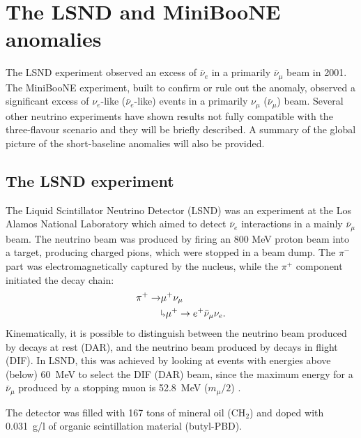 \chapter{\label{ch:3-anomalies}The LSND and MiniBooNE anomalies}

\minitoc

The LSND experiment observed an excess of $\bar{\nu}_{e}$ in a primarily $\bar{\nu}_{\mu}$ beam in 2001. The MiniBooNE experiment, built to confirm or rule out the anomaly, observed a significant excess of $\nu_{e}$-like ($\bar{\nu}_{e}$-like) events in a primarily $\nu_{\mu}$ ($\bar{\nu}_{\mu}$) beam. Several other neutrino experiments have shown results not fully compatible with the three-flavour scenario and they will be briefly described.  A summary of the global picture of the short-baseline anomalies will also be provided.

\section{The LSND experiment}
The Liquid Scintillator Neutrino Detector (LSND) was an experiment at the Los Alamos National Laboratory which aimed to detect $\bar{\nu}_e$ interactions in a mainly $\bar{\nu}_{\mu}$ beam. The neutrino beam was produced by firing an 800 MeV proton beam into a target, producing charged pions, which were stopped in a beam dump. The $\pi^-$ part was electromagnetically captured by the nucleus, while the $\pi^+$ component initiated the decay chain:
\begin{align}
    \pi^+ \rightarrow & \mu^+\nu_{\mu}\\
    & \rotatebox[origin=c]{180}{$\Lsh$}	 \mu^{+} \rightarrow e^+\bar{\nu}_{\mu}\nu_{e}.
\end{align}
Kinematically, it is possible to distinguish between the neutrino beam produced by decays at rest (DAR), and the neutrino beam produced by decays in flight (DIF). In LSND, this was achieved by looking at events with energies above (below) 60~MeV to select the DIF (DAR) beam, since the maximum energy for a $\bar{\nu}_{\mu}$ produced by a stopping muon is 52.8~MeV ($m_{\mu}/2$) .

The detector was filled with 167 tons of mineral oil (CH$_2$) and doped with 0.031~g/l of organic scintillation material (butyl-PBD).

